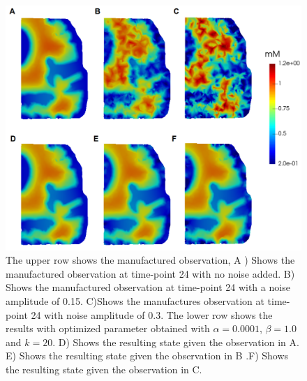 \documentclass[11pt,a4paper]{article}
\begin{document}
\begin{figure}
\centering
\includegraphics[scale=0.4]{24-clrscl-0212-regp--40-interp.png}
\caption{The upper row shows the manufactured observation, A ) Shows the manufactured observation at time-point 24 with no noise added. B) Shows the manufactured observation at time-point 24 with a noise amplitude of 0.15. C)Shows the manufactures observation at time-point 24 with noise amplitude of 0.3. The lower row shows the results with optimized parameter obtained with $\alpha=0.0001$, $\beta=1.0$ and $k=20$. D) Shows the resulting state given the observation in A. E)  Shows the resulting state given the observation in B .F) Shows the resulting state given the observation in C.  }
\label{24hourswithnoise}
\end{figure}




%
\end{document}
